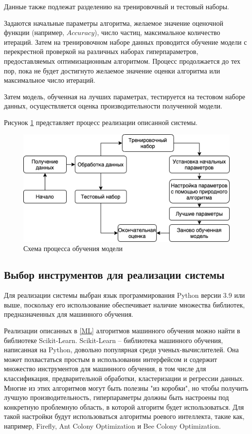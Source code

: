 Данные также подлежат разделению на тренировочный и тестовый наборы.

Задаются начальные параметры алгоритма, желаемое значение оценочной функции (например, $Accuracy$),
число частиц, максимальное количество итераций. Затем на тренировочном наборе данных
проводится обучение модели с перекрестной проверкой на различных наборах
гиперпараметров, предоставляемых оптимизационным алгоритмом. Процесс продолжается
до тех пор, пока не будет достигнуто желаемое значение оценки алгоритма или
максимальное число итераций.

Затем модель, обученная на лучших параметрах, тестируется на тестовом наборе данных,
осуществляется оценка производительности полученной модели.

Рисунок \ref{scheme} представляет процесс реализации описанной системы.

\begin{figure}[H]
      \centering
      \includegraphics[width=140mm]{static/prog.png}
      \caption{Схема процесса обучения модели}
      \label{scheme}
\end{figure}

\subsection{Выбор инструментов для реализации системы}

Для реализации системы выбран язык программирования Python версии 3.9 или выше,
поскольку его использование обеспечивает наличие множества библиотек,
предназначенных для машинного обучения.

Реализации описанных в \ref{ML} алгоритмов машинного обучения
можно найти в библиотеке Scikit-Learn. Scikit-Learn --
библиотека машинного обучения, написанная на Python, довольно популярная
среди ученых-вычислителей. Она может похвастаться простым в использовании
интерфейсом и содержит множество инструментов для машинного обучения, в том числе
для классификация, предварительной обработки, кластеризации и регрессии данных.
Многие из этих алгоритмов могут быть полезны "из коробки", но чтобы получить
лучшую производительность, гиперпараметры должны быть настроены под конкретную
проблемную область, в которой алгоритм будет использоваться. Для такой настройки
будут использоваться алгоритмы роевого интеллекта, такие как, например, Firefly, Ant
Colony Optimization и Bee Colony Optimization.
